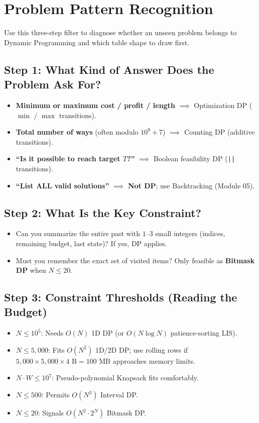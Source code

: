 \documentclass[11pt,a4paper]{article}
\theoremstyle{definition}
\begin{document}
\section{Problem Pattern Recognition}

Use this three-step filter to diagnose whether an unseen problem belongs to Dynamic Programming and which table shape to draw first.

\subsection*{Step 1: What Kind of Answer Does the Problem Ask For?}
\begin{itemize}
    \item \textbf{Minimum or maximum cost / profit / length} $\implies$ Optimization DP ($\min$ / $\max$ transitions).
    \item \textbf{Total number of ways} (often modulo $10^9 + 7$) $\implies$ Counting DP (additive transitions).
    \item \textbf{``Is it possible to reach target $T$?''} $\implies$ Boolean feasibility DP (\texttt{||} transitions).
    \item \textbf{``List ALL valid solutions''} $\implies$ \textbf{Not DP}; use Backtracking (Module 05).
\end{itemize}

\subsection*{Step 2: What Is the Key Constraint?}
\begin{itemize}
    \item Can you summarize the entire past with $1$--$3$ small integers (indices, remaining budget, last state)? If yes, DP applies.
    \item Must you remember the exact set of visited items? Only feasible as \textbf{Bitmask DP} when $N \le 20$.
\end{itemize}

\subsection*{Step 3: Constraint Thresholds (Reading the Budget)}
\begin{itemize}
    \item $N \le 10^5$: Needs $O(N)$ 1D DP (or $O(N \log N)$ patience-sorting LIS).
    \item $N \le 5{,}000$: Fits $O(N^2)$ 1D/2D DP; use rolling rows if $5{,}000 \times 5{,}000 \times 4\text{ B} = 100\text{ MB}$ approaches memory limits.
    \item $N \cdot W \le 10^7$: Pseudo-polynomial Knapsack fits comfortably.
    \item $N \le 500$: Permits $O(N^3)$ Interval DP.
    \item $N \le 20$: Signals $O(N^2 \cdot 2^N)$ Bitmask DP.
\end{itemize}
\end{document}
